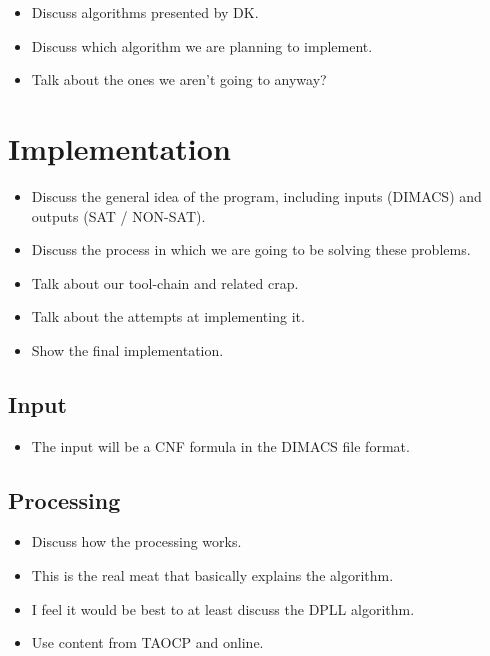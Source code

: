 \documentclass{article}
\begin{document}
\begin{itemize}
    \item Discuss algorithms presented by DK.
    \item Discuss which algorithm we are planning to implement.
    \item Talk about the ones we aren't going to anyway?
\end{itemize}

\section{Implementation}
\begin{itemize}
    \item Discuss the general idea of the program, including inputs (DIMACS) and outputs (SAT / NON-SAT).
    \item Discuss the process in which we are going to be solving these problems.
    \item Talk about our tool-chain and related crap.
    \item Talk about the attempts at implementing it.
    \item Show the final implementation.
\end{itemize}

\subsection{Input}
\begin{itemize}
    \item The input will be a CNF formula in the DIMACS file format.
\end{itemize}

\subsection{Processing}
\begin{itemize}
    \item Discuss how the processing works.
    \item This is the real meat that basically explains the algorithm.
    \item I feel it would be best to at least discuss the DPLL algorithm.
    \item Use content from TAOCP and online.
\end{itemize}
\end{document}

